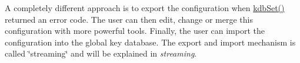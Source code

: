 A completely different approach is to export the configuration when {\ttfamily \mbox{\hyperlink{group__kdb_ga11436b058408f83d303ca5e996832bcf}{kdb\+Set()}}} returned an error code. The user can then edit, change or merge this configuration with more powerful tools. Finally, the user can import the configuration into the global key database. The export and import mechanism is called \char`\"{}streaming\char`\"{} and will be explained in {\itshape streaming}. 